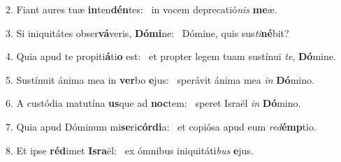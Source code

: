 2. Fiant aures tuæ \textbf{in}ten\textbf{dén}tes: \ast\  in vocem deprecatió\textit{nis} \textbf{me}æ.\

3. Si iniquitátes obser\textbf{vá}veris, \textbf{Dó}\textbf{mi}ne: \ast\  Dómine, quis sus\textit{ti}\textbf{né}bit?\

4. Quia apud te propiti\textbf{á}ti\textbf{o} est: \ast\  et propter legem tuam sustínui \textit{te}, \textbf{Dó}mine.\

5. Sustínuit ánima mea in \textbf{ver}bo \textbf{e}jus: \ast\  sperávit ánima mea \textit{in} \textbf{Dó}mino.\

6. A custódia matutína \textbf{us}que ad \textbf{noc}tem: \ast\  speret Israël \textit{in} \textbf{Dó}mino.\

7. Quia apud Dóminum mi\textbf{se}ri\textbf{cór}\textbf{di}a: \ast\  et copiósa apud eum \textit{red}\textbf{émp}tio.\

8. Et ipse \textbf{réd}imet \textbf{Is}\textbf{ra}ël: \ast\  ex ómnibus iniquitáti\textit{bus} \textbf{e}jus.\

